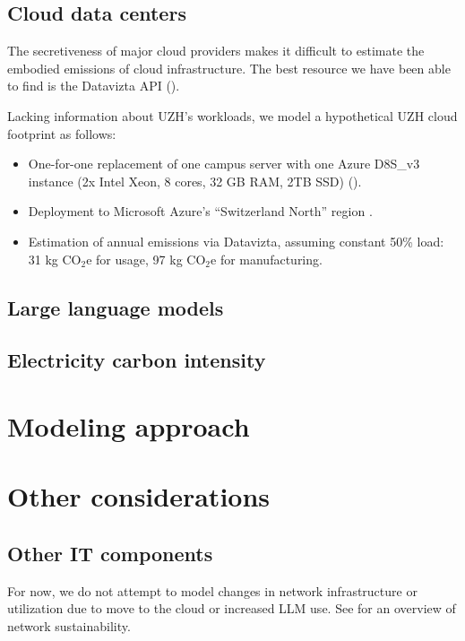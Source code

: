 \documentclass[11pt]{article}
\begin{document}
\subsection*{Cloud data centers}

The secretiveness of major cloud providers makes it difficult to estimate the embodied emissions of cloud
infrastructure. The best resource we have been able to find is the Datavizta API (\textcite{boavizta}).

Lacking information about UZH's workloads, we model a hypothetical UZH cloud footprint as follows:
\begin{itemize}
    \item One-for-one replacement of one campus server with one Azure D8S\_v3 instance (2x Intel
      Xeon, 8 cores, 32 GB RAM, 2TB SSD) (\cite{msftvms}).
      \item Deployment to Microsoft Azure's ``Switzerland North'' region .
      \item Estimation of annual emissions via Datavizta, assuming constant 50\% load: 31 kg CO$_2$e for usage,
      97 kg CO$_2$e for manufacturing.
\end{itemize}

\subsection*{Large language models}

\subsection*{Electricity carbon intensity}

\cite{krebs2018umweltbilanz}

\section*{Modeling approach}

\section*{Other considerations}

\subsection*{Other IT components}

For now, we do not attempt to model changes in network infrastructure or utilization due to
move to the cloud or increased LLM use. See \textcite{jacob2023} for an overview of
network sustainability.
\end{document}
